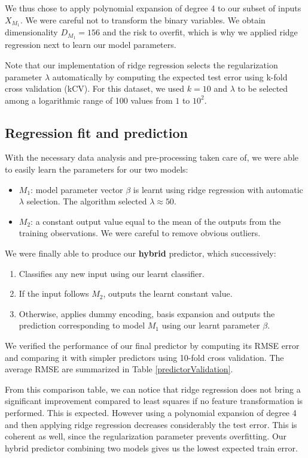 \documentclass{article} %
\begin{document}
  We thus chose to apply polynomial expansion of degree 4 to our subset of inputs $X_{M_1}$. We were careful not to transform the binary variables. We obtain dimensionality $D_{M_1} = 156$ and the risk to overfit, which is why we applied ridge regression next to learn our model parameters.

  Note that our implementation of ridge regression selects the regularization parameter $\lambda$ automatically by computing the expected test error using k-fold cross validation (kCV). For this dataset, we used $k = 10$ and $\lambda$ to be selected among a logarithmic range of 100 values from $1$ to $10^2$.

  \subsection{Regression fit and prediction}
  With the necessary data analysis and pre-processing taken care of, we were able to easily learn the parameters for our two models:
  \begin{itemize}
    \item $M_1$: model parameter vector $\beta$ is learnt using ridge regression with automatic $\lambda$ selection. The algorithm selected $\lambda \approx 50$.
    \item $M_2$: a constant output value equal to the mean of the outputs from the training observations. We were careful to remove obvious outliers.
  \end{itemize}

  We were finally able to produce our \textbf{hybrid} predictor, which successively:
  \begin{enumerate}
    \item Classifies any new input using our learnt classifier.
    \item If the input follows $M_2$, outputs the learnt constant value.
    \item Otherwise, applies dummy encoding, basis expansion and outputs the prediction corresponding to model $M_1$ using our learnt parameter $\beta$.
  \end{enumerate}

  We verified the performance of our final predictor by computing its RMSE error and comparing it with simpler predictors using 10-fold cross validation. The average RMSE are summarized in Table \ref{predictorValidation}.

  From this comparison table, we can notice that ridge regression does not bring a significant improvement compared to least squares if no feature transformation is performed. This is expected. However using a polynomial expansion of degree 4 and then applying ridge regression decreases considerably the test error. This is coherent as well, since the regularization parameter prevents overfitting. Our hybrid predictor combining two models gives us the lowest expected train error.
\end{document}
